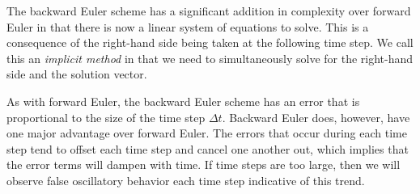 The backward Euler scheme has a significant addition in complexity over forward Euler in that there is now a linear system of equations to solve. This is a consequence of the right-hand side being taken at the following time step. We call this an \emph{implicit method} in that we need to simultaneously solve for the right-hand side and the solution vector.

As with forward Euler, the backward Euler scheme has an error that is proportional to the size of the time step $\Delta t$. Backward Euler does, however, have one major advantage over forward Euler. The errors that occur during each time step tend to offset each time step and cancel one another out, which implies that the error terms will dampen with time. If time steps are too large, then we will observe false oscillatory behavior each time step indicative of this trend.

